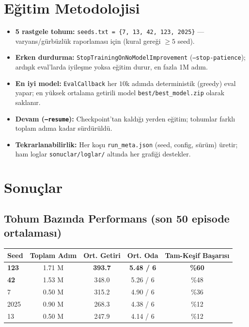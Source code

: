 \documentclass[11pt,a4paper]{article}
\begin{document}
\section{Eğitim Metodolojisi}
\begin{itemize}[noitemsep]
  \item \textbf{5 rastgele tohum:} \texttt{seeds.txt = \{7, 13, 42, 123, 2025\}}
  --- varyans/gürbüzlük raporlaması için (kural gereği $\ge 5$ seed).
  \item \textbf{Erken durdurma:} \texttt{StopTrainingOnNoModelImprovement}
  (\texttt{--stop-patience}); ardışık eval'larda iyileşme yoksa eğitim durur, en
  fazla 1M adım.
  \item \textbf{En iyi model:} \texttt{EvalCallback} her $10$k adımda deterministik
  (greedy) eval yapar; en yüksek ortalama getirili model
  \texttt{best/best\_model.zip} olarak saklanır.
  \item \textbf{Devam (\texttt{--resume}):} Checkpoint'tan kaldığı yerden eğitim;
  tohumlar farklı toplam adıma kadar sürdürüldü.
  \item \textbf{Tekrarlanabilirlik:} Her koşu \texttt{run\_meta.json} (seed,
  config, sürüm) üretir; ham loglar \texttt{sonuclar/loglar/} altında her grafiği
  destekler.
\end{itemize}

\section{Sonuçlar}
\subsection{Tohum Bazında Performans (son 50 episode ortalaması)}
\begin{center}
\begin{tabular}{lcccc}
\toprule
\textbf{Seed} & \textbf{Toplam Adım} & \textbf{Ort. Getiri} & \textbf{Ort. Oda} & \textbf{Tam-Keşif Başarısı} \\
\midrule
\textbf{123} & 1.71 M & \textbf{393.7} & \textbf{5.48 / 6} & \textbf{\%60} \\
\textbf{42}  & 1.53 M & 348.0 & 5.26 / 6 & \%48 \\
7            & 0.50 M & 315.2 & 4.90 / 6 & \%36 \\
2025         & 0.90 M & 268.3 & 4.38 / 6 & \%12 \\
13           & 0.50 M & 247.9 & 4.14 / 6 & \%12 \\
\bottomrule
\end{tabular}
\end{center}
\end{document}
